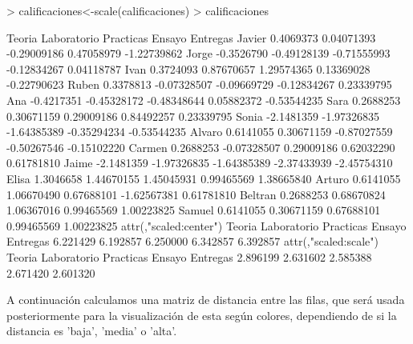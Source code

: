 \documentclass[a4paper]{article}
\begin{document}
\begin{Schunk}
\begin{Sinput}
> calificaciones<-scale(calificaciones)
> calificaciones
\end{Sinput}
\begin{Soutput}
            Teoria Laboratorio   Practicas      Ensayo    Entregas
Javier   0.4069373  0.04071393 -0.29009186  0.47058979 -1.22739862
Jorge   -0.3526790 -0.49128139 -0.71555993 -0.12834267  0.04118787
Ivan     0.3724093  0.87670657  1.29574365  0.13369028 -0.22790623
Ruben    0.3378813 -0.07328507 -0.09669729 -0.12834267  0.23339795
Ana     -0.4217351 -0.45328172 -0.48348644  0.05882372 -0.53544235
Sara     0.2688253  0.30671159  0.29009186  0.84492257  0.23339795
Sonia   -2.1481359 -1.97326835 -1.64385389 -0.35294234 -0.53544235
Alvaro   0.6141055  0.30671159 -0.87027559 -0.50267546 -0.15102220
Carmen   0.2688253 -0.07328507  0.29009186  0.62032290  0.61781810
Jaime   -2.1481359 -1.97326835 -1.64385389 -2.37433939 -2.45754310
Elisa    1.3046658  1.44670155  1.45045931  0.99465569  1.38665840
Arturo   0.6141055  1.06670490  0.67688101 -1.62567381  0.61781810
Beltran  0.2688253  0.68670824  1.06367016  0.99465569  1.00223825
Samuel   0.6141055  0.30671159  0.67688101  0.99465569  1.00223825
attr(,"scaled:center")
     Teoria Laboratorio   Practicas      Ensayo    Entregas 
   6.221429    6.192857    6.250000    6.342857    6.392857 
attr(,"scaled:scale")
     Teoria Laboratorio   Practicas      Ensayo    Entregas 
   2.896199    2.631602    2.585388    2.671420    2.601320 
\end{Soutput}
\end{Schunk}

A continuación calculamos una matriz de distancia entre las filas, que será usada posteriormente para la visualización de esta según colores, dependiendo de si la distancia es 'baja', 'media' o 'alta'.
\end{document}
